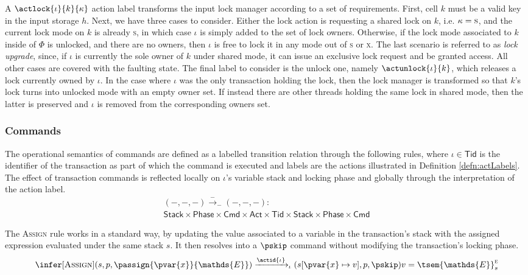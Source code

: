 A $\actlock{\iota}{k}{\kappa}$ action label transforms the input lock manager according to a set of requirements. First, cell $k$ must be a valid key in the input storage $h$. Next, we have three cases to consider. Either the lock action is requesting a shared lock on $k$, i.e. $\kappa = \textsc{s}$, and the current lock mode on $k$ is already \textsc{s}, in which case $\iota$ is simply added to the set of lock owners. Otherwise, if the lock mode associated to $k$ inside of $\Phi$ is unlocked, and there are no owners, then $\iota$ is free to lock it in any mode out of \textsc{s} or \textsc{x}. The last scenario is referred to as \textit{lock upgrade}, since, if $\iota$ is currently the sole owner of $k$ under shared mode, it can issue an exclusive lock request and be granted access. All other cases are covered with the faulting state. The final label to consider is the unlock one, namely $\actunlock{\iota}{k}$, which releases a lock currently owned by $\iota$. In the case where $\iota$ was the only transaction holding the lock, then the lock manager is transformed so that $k$'s lock turns into unlocked mode with an empty owner set. If instead there are other threads holding the same lock in shared mode, then the latter is preserved and $\iota$ is removed from the corresponding owners set.

\subsubsection{Commands}
	
The operational semantics of commands are defined as a labelled transition relation through the following rules, where $\iota \in \mathsf{Tid}$ is the identifier of the transaction as part of which the command is executed and labels are the actions illustrated in Definition \ref{defn:actLabels}. The effect of transaction commands is reflected locally on $\iota$'s variable stack and locking phase and globally through the interpretation of the action label.
\begin{gather*}
	(-, -, -) \xrightarrow{-}_- (-, -, -) : \\
	\mathsf{Stack} \times \mathsf{Phase} \times \mathsf{Cmd}
	\times \mathsf{Act} \times \mathsf{Tid} \times
	\mathsf{Stack} \times \mathsf{Phase} \times \mathsf{Cmd}
\end{gather*}

The \textsc{Assign} rule works in a standard way, by updating the value associated to a variable in the transaction's stack with the assigned expression evaluated under the same stack $s$. It then resolves into a $\pskip$ command without modifying the transaction's locking phase.
\[
\infer[\textsc{Assign}]
{
	(s, p, \passign{\pvar{x}}{\mathds{E}})
	\xrightarrow{\actid{\iota}}_\iota
	(s[\pvar{x} \mapsto v], p, \pskip)
}
{
	v = \tsem{\mathds{E}}^\textsc{e}_s
}
\]

